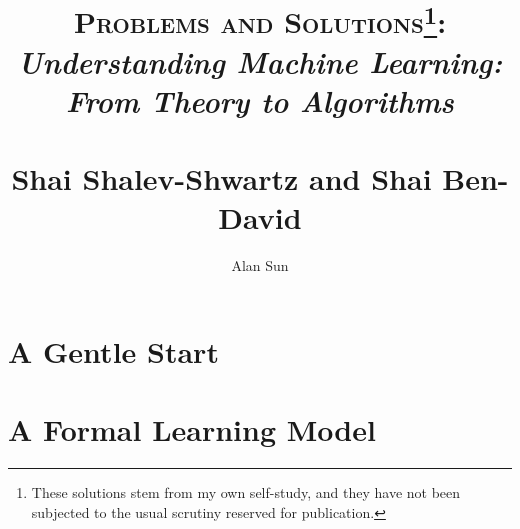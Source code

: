 \documentclass{report}
\title{\textsc{Problems and Solutions\footnote{These solutions stem from my own self-study, and they have not been subjected to the usual scrutiny reserved for publication.}:} \\ 
\textit{Understanding Machine Learning: From Theory to Algorithms} \\ 
~\\ \large Shai Shalev-Shwartz and Shai Ben-David}
\author{Alan Sun}
\date{}
\begin{document}
\maketitle

\tableofcontents

\setcounter{chapter}{1}
\chapter{A Gentle Start}


\chapter{A Formal Learning Model}

\end{document}
